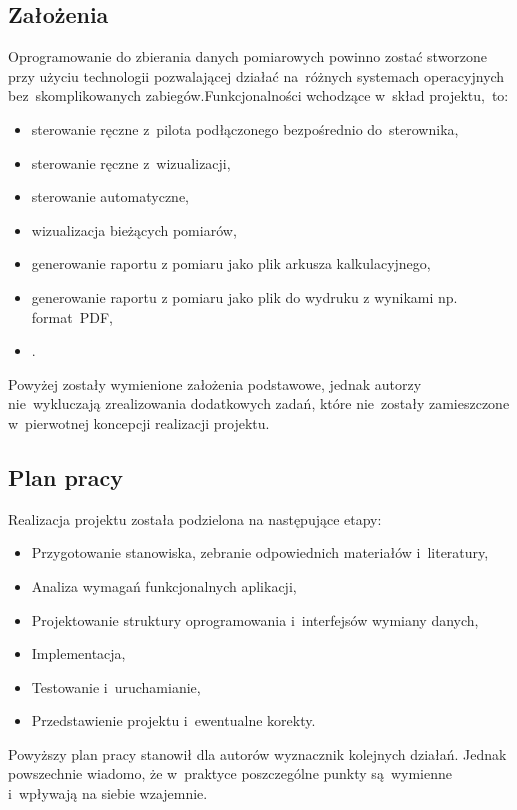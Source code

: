 \subsection{Założenia}
Oprogramowanie do zbierania danych pomiarowych powinno zostać stworzone przy użyciu technologii pozwalającej działać na~różnych systemach operacyjnych bez~skomplikowanych zabiegów.Funkcjonalności wchodzące w~skład projektu,~to:
\begin{itemize}
\item sterowanie ręczne z~pilota podłączonego bezpośrednio do~sterownika,
\item sterowanie ręczne z~wizualizacji,
\item sterowanie automatyczne, 
\item wizualizacja bieżących pomiarów,
\item generowanie raportu z pomiaru jako plik arkusza kalkulacyjnego,
\item generowanie raportu z pomiaru jako plik do wydruku z wynikami np. format~PDF,
\item .
\end{itemize}
\indent
\indent Powyżej zostały wymienione założenia podstawowe, jednak autorzy nie~wykluczają zrealizowania dodatkowych zadań, które nie~zostały zamieszczone w~pierwotnej koncepcji realizacji projektu.

\subsection{Plan pracy}
Realizacja projektu została podzielona na następujące etapy:
\begin{itemize}
\item Przygotowanie stanowiska, zebranie odpowiednich materiałów i~literatury,
\item Analiza wymagań funkcjonalnych aplikacji,
\item Projektowanie struktury oprogramowania i~interfejsów wymiany danych,
\item Implementacja,
\item Testowanie i~uruchamianie,
\item Przedstawienie projektu i~ewentualne korekty.
\end{itemize}
\indent
\indent Powyższy plan pracy stanowił dla autorów wyznacznik kolejnych działań. Jednak powszechnie wiadomo, że w~praktyce poszczególne punkty są~wymienne i~wpływają na siebie wzajemnie.

